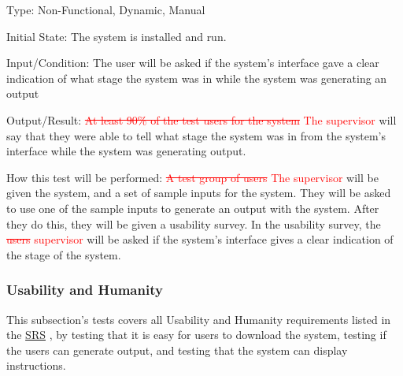 \documentclass[12pt, titlepage]{article}
\begin{document}
\begin{enumerate}
Type: Non-Functional, Dynamic, Manual
					
Initial State: 
The system is installed and run.		

Input/Condition: 
The user will be asked if the system's interface gave a clear indication of what stage the system was in while the system was generating an output

Output/Result: 
\textcolor{red}{\sout{At least 90\% of the test users for the system} The supervisor} will say that they were able to tell what stage the system was in from the system's interface while the system was generating output.
					
How this test will be performed:
\textcolor{red}{\sout{A test group of users} The supervisor} will be given the system, and a set of sample inputs for the system. They will be asked to use one of the sample inputs to generate an output with the system. After they do this, they will be given a usability survey. In the usability survey, the \textcolor{red}{\sout{users} supervisor} will be asked if the system's interface gives a clear indication of the stage of the system.

\end{enumerate}

\subsubsection{Usability and Humanity}
This subsection's tests covers all Usability and Humanity requirements listed in the \href{https://github.com/paezha/PyERT-BLACK/blob/main/docs/SRS/SRS.pdf}{SRS} \citep{SRS}, by testing that it is easy for users to download the system, testing if the users can generate output, and testing that the system can display instructions. 
\end{document}
